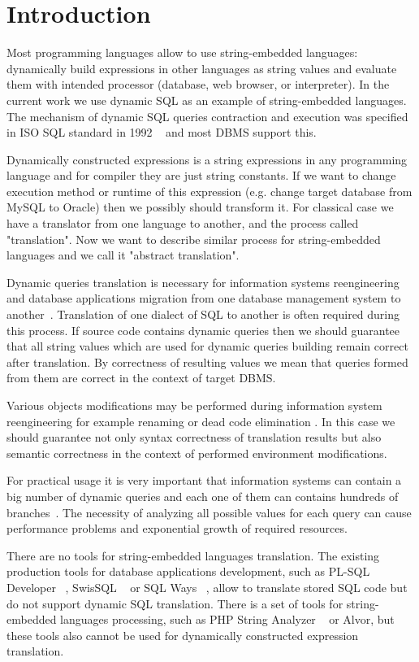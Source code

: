 \documentclass{llncs}
\begin{document}
\section{Introduction}

Most programming languages allow to use string-embedded languages: dynamically build expressions in other languages as string values and evaluate them with intended processor (database, web browser, or interpreter). In the current work we use dynamic SQL as an example of string-embedded languages. The mechanism of dynamic SQL queries contraction and execution was specified in ISO SQL standard in 1992 ~\cite{ISO} and most DBMS support this. 

Dynamically constructed expressions is a string expressions in any programming language and for compiler they are just string constants. If we want to change execution method or runtime of this expression (e.g. change target database from MySQL to Oracle) then we possibly should transform it. For classical case we have a translator from one language to another, and the process called "translation". Now we want to describe similar process for string-embedded languages and we call it "abstract translation".

Dynamic queries translation is necessary for information systems reengineering and database applications migration from one database management system to another~\cite{NetDbTransform}. Translation of one dialect of SQL to another is often required during this process. If source code contains dynamic queries then we should guarantee that all string values which are used for dynamic queries building remain correct after translation. By correctness of resulting values we mean that queries formed from them are correct in the context of target DBMS.
 
Various objects modifications may be performed during information system reengineering for example renaming or dead code elimination . In this case we should guarantee not only syntax correctness of translation results but also semantic correctness in the context of performed environment modifications. 

For practical usage it is very important that information systems can contain a big number of dynamic queries and each one of them can contains hundreds of branches~\cite{TiunovaUIInt}. The necessity of analyzing all possible values for each query can cause  performance problems and exponential growth of required resources.

There are no tools for string-embedded languages translation. The existing production tools for database applications development, such as PL-SQL Developer ~\cite{PLSQL}, SwisSQL ~\cite{SwissSQL} or SQL Ways ~\cite{SQLWays}, allow to translate stored SQL code but do not support dynamic SQL translation. There is a set of tools for string-embedded languages processing, such as PHP String Analyzer ~\cite{PHPSA} or Alvor, but these tools also cannot be used for dynamically constructed expression translation.
\end{document}
